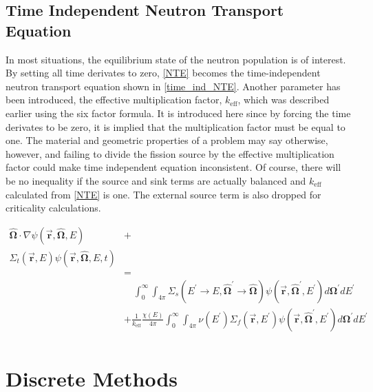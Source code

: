  \subsection{Time Independent Neutron Transport Equation}

In most situations, the equilibrium state of the neutron population is of interest.  By setting all time derivates to zero, \eqref{NTE} becomes the time-independent neutron transport equation shown in \eqref{time_ind_NTE}.  Another parameter has been introduced, the effective multiplication factor, $k_\mathrm{eff}$, which was described earlier using the six factor formula.  It is introduced here since by forcing the time derivates to be zero, it is implied that the multiplication factor must be equal to one.  The material and geometric properties of a problem may say otherwise, however, and failing to divide the fission source by the effective multiplication factor could make time independent equation inconsistent.  Of course, there will be no inequality if the source and sink terms are actually balanced and $k_\mathrm{eff}$ calculated from \eqref{NTE} is one.  The external source term is also dropped for criticality calculations.

\begin{equation}
\label{time_ind_NTE}
\begin{split}
\boldsymbol{\hat{\Omega}}  \cdot \nabla \psi(\boldsymbol{\vec{r}},\boldsymbol{\hat{\Omega}},E) &+ \\
\Sigma_t(\boldsymbol{\vec{r}},E) \psi(\boldsymbol{\vec{r}},\boldsymbol{\hat{\Omega}},E,t) & \\
& =  \\
& \quad \int_0^\infty  \int_{4\pi} \Sigma_s(E^\prime \rightarrow E,\boldsymbol{\hat{\Omega}}^\prime \rightarrow \boldsymbol{\hat{\Omega}}) \psi(\boldsymbol{\vec{r}},\boldsymbol{\hat{\Omega}}^\prime,E^\prime) d\boldsymbol{\Omega}^\prime dE^\prime  \\
&+ \frac{1}{k_{\mathrm{eff}}}\frac{\chi(E)}{4\pi} \int_0^\infty  \int_{4\pi}   \nu(E^\prime) \Sigma_f(\boldsymbol{\vec{r}},E^\prime) \psi(\boldsymbol{\vec{r}},\boldsymbol{\hat{\Omega}}^\prime,E^\prime) d\boldsymbol{\Omega}^\prime  dE^\prime\\
\end{split}
 \end{equation}
 

\section{Discrete Methods}

